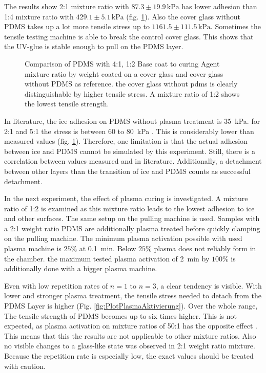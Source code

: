 The results show 2:1 mixture ratio with $87.3\pm19.9\,\si{\kilo\pascal}$ has lower adhesion than 1:4 mixture ratio with $429.1\pm5.1\,\si{\kilo\pascal}$ (fig. \ref{fig:vgl4:1zu1:2zuGlas}). Also the cover glass without PDMS takes up a lot more tensile stress up to $1161.5\pm111.5\,\si{\kilo\pascal}$. Sometimes the tensile testing machine is able to break the control cover glass. This shows that the UV-glue is stable enough to pull on the PDMS layer.


\begin{figure}[hbt!]
	\centering	
	
	\caption{Comparison of PDMS with 4:1, 1:2 Base coat to curing Agent mixture ratio by weight coated on a cover glass and cover glass without PDMS as reference. the cover glass without pdms is clearly distinguishable by higher tensile stress. A mixture ratio of 1:2 shows the lowest tensile strength.}
	\label{fig:vgl4:1zu1:2zuGlas}
\end{figure}


In literature, the ice adhesion on PDMS without plasma treatment is \SI{35}{\kilo\pascal}. for 2:1 and 5:1 the stress is between $60$ to \SI{80}{\kilo\pascal} \cite{IbanezIbanez.2022}. This is considerably lower than measured values (fig. \ref{fig:vgl4:1zu1:2zuGlas}). Therefore, one limitation is that the actual adhesion between ice and PDMS cannot be simulated by this experiment. Still, there is a correlation between values measured and in literature. Additionally, a detachment between other layers than the transition of ice and PDMS counts as successful detachment. 

In the next experiment, the effect of plasma curing is investigated. A mixture ratio of 1:2 is examined as this mixture ratio leads to the lowest adhesion to ice and other surfaces. The same setup on the pulling machine is used. Samples with a 2:1 weight ratio PDMS are additionally plasma treated before quickly clamping on the pulling machine. The minimum plasma activation possible with used plasma machine is $25\%$ at \SI{0.1}{\minute}. Below $25\%$ plasma does not reliably form in the chamber. the maximum tested plasma activation of \SI{2}{\minute} by $100\%$ is additionally done with a bigger plasma machine.

Even with low repetition rates of $n = 1$ to $ n =3$, a clear tendency is visible. With lower and stronger plasma treatment, the tensile stress needed to detach from the PDMS Layer is higher (Fig. \ref{fig:PlotPlasmaAktivierung}). Over the whole range, The tensile strength of PDMS becomes up to six times higher. This is not expected, as plasma activation on mixture ratios of 50:1 has the opposite effect \cite{Ohishi.2017}. This means that this the results are not applicable to other mixture ratios. Also no visible changes to a glass-like state was observed in 2:1 weight ratio mixture. Because the repetition rate is especially low, the exact values should be treated with caution. 

